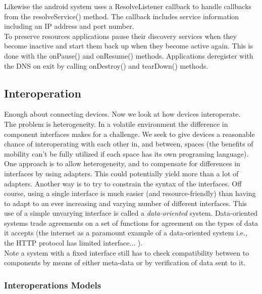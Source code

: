 Likewise the android system uses a ResolveListener callback to handle callbacks from the resolveService() method. The callback includes service information including an IP address and port number. 	\\

To preserve resources applications pause their discovery services when they become inactive and start them back up when they become active again. This is done with the onPause() and onResume() methods. Applications deregister with the DNS on exit by calling onDestroy() and tearDown() methods. 





\subsection{Interoperation}

Enough about connecting devices. Now we look at how devices interoperate.\\

The problem is heterogeneity. In a volatile environment the difference in component interfaces makes for a challenge. We seek to give devices a reasonable chance of interoperating with each other in, and between, spaces (the benefits of mobility can't be fully utilized if each space has its own programing  language). One approach is to allow heterogeneity, and to compensate for differences in interfaces by using adapters. This could potentially yield more than a lot of adapters. Another way is to try to constrain the syntax of the interfaces. Off course, using a single interface is much easier (and resource-friendly) than having to adapt to an ever increasing and varying number of different interfaces. This use of a simple unvarying interface is called a \textit{data-oriented} system. Data-oriented systems trade agreements on a set of functions for agreement on the types of data it accepts (the internet as a paramount example of a data-oriented system i.e., the HTTP protocol has limited interface... ).   \\

Note a system with a fixed interface still has to check compatibility between to components by means of either meta-data or by  verification of data sent to it. \\

\subsubsection{Interoperations Models}

